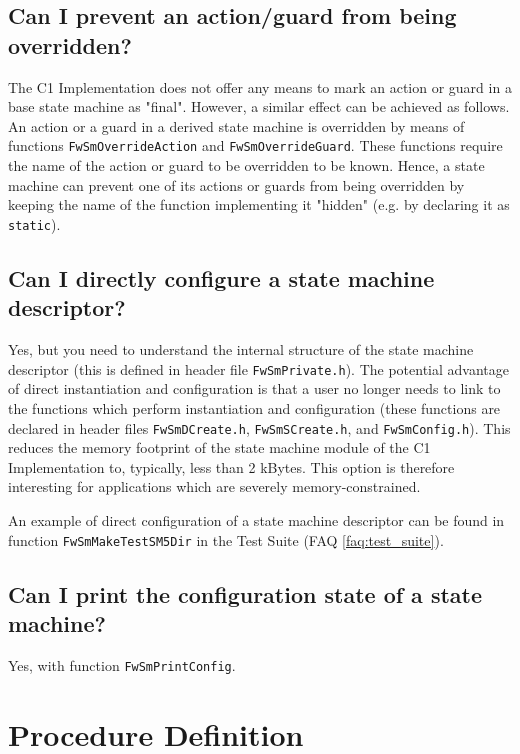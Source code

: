 \documentclass[faq]{../fwprofile}
\begin{document}
\subsection{Can I prevent an action/guard from being overridden?}
The C1 Implementation does not offer any means to mark an action or guard in a base state machine as "final". However, a similar effect can be achieved as follows. 
An action or a guard in a derived state machine is overridden by means of functions \texttt{FwSmOverrideAction} and \texttt{FwSmOverrideGuard}. 
These functions require the name of the action or guard to be overridden to be known. Hence, a state machine can prevent one of its actions or guards 
from being overridden by keeping the name of the function implementing it "hidden" (e.g. by declaring it as \texttt{static}).

\subsection{Can I directly configure a state machine descriptor?}
Yes, but you need to understand the internal structure of the state machine descriptor (this is defined in header file \texttt{FwSmPrivate.h}). 
The potential advantage of direct instantiation and configuration is that a user no longer needs to link to the functions which perform instantiation and 
configuration (these functions are declared in header files \texttt{FwSmDCreate.h}, \texttt{FwSmSCreate.h}, and \texttt{FwSmConfig.h}). 
This reduces the memory footprint of the state machine module of the C1 Implementation to, typically, less than 2 kBytes. 
This option is therefore interesting for applications which are severely memory-constrained.

An example of direct configuration of a state machine descriptor can be found in function \texttt{FwSmMakeTestSM5Dir} in the Test Suite (FAQ \ref{faq:test_suite}).

\subsection{Can I print the configuration state of a state machine?}
Yes, with function \texttt{FwSmPrintConfig}.

\section{Procedure Definition}
\end{document}
